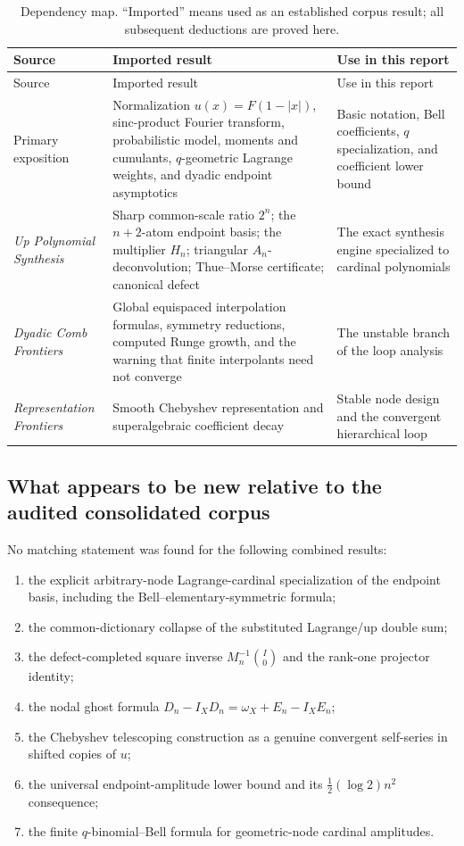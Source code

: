 \documentclass[11pt,oneside]{article}
\theoremstyle{definition}
\theoremstyle{remark}
\newcommand{\1}{\mathbf{1}}
\begin{document}
\begin{longtable}{@{}p{}p{}p{}@{}}
\caption{Dependency map.  ``Imported'' means used as an established corpus
result; all subsequent deductions are proved here.}\label{tab:dependency}\\
\toprule
Source & Imported result & Use in this report\\
\midrule
\endfirsthead
\toprule
Source & Imported result & Use in this report\\
\midrule
\endhead
Primary exposition & Normalization $u(x)=F(1-|x|)$, sinc-product Fourier
transform, probabilistic model, moments and cumulants, $q$-geometric Lagrange
weights, and dyadic endpoint asymptotics & Basic notation, Bell coefficients,
$q$ specialization, and coefficient lower bound\\
\addlinespace
\emph{Up Polynomial Synthesis} & Sharp common-scale ratio $2^n$; the
$n+2$-atom endpoint basis; the multiplier $H_n$; triangular
$A_n$-deconvolution; Thue--Morse certificate; canonical defect & The exact
synthesis engine specialized to cardinal polynomials\\
\addlinespace
\emph{Dyadic Comb Frontiers} & Global equispaced interpolation formulas,
symmetry reductions, computed Runge growth, and the warning that finite
interpolants need not converge & The unstable branch of the loop analysis\\
\addlinespace
\emph{Representation Frontiers} & Smooth Chebyshev representation and
superalgebraic coefficient decay & Stable node design and the convergent
hierarchical loop\\
\bottomrule
\end{longtable}

\subsection{What appears to be new relative to the audited consolidated corpus}

No matching statement was found for the following combined results:

\begin{enumerate}
\item the explicit arbitrary-node Lagrange-cardinal specialization of the
endpoint basis, including the Bell--elementary-symmetric formula;
\item the common-dictionary collapse of the substituted Lagrange/up double
sum;
\item the defect-completed square inverse
$M_n^{-1}\binom{I}{0}$ and the rank-one projector identity;
\item the nodal ghost formula
$D_n-I_XD_n=\omega_X+E_n-I_XE_n$;
\item the Chebyshev telescoping construction as a genuine convergent
self-series in shifted copies of $u$;
\item the universal endpoint-amplitude lower bound and its
$\frac12(\log2)n^2$ consequence;
\item the finite $q$-binomial--Bell formula for geometric-node cardinal
amplitudes.
\end{enumerate}
\end{document}
